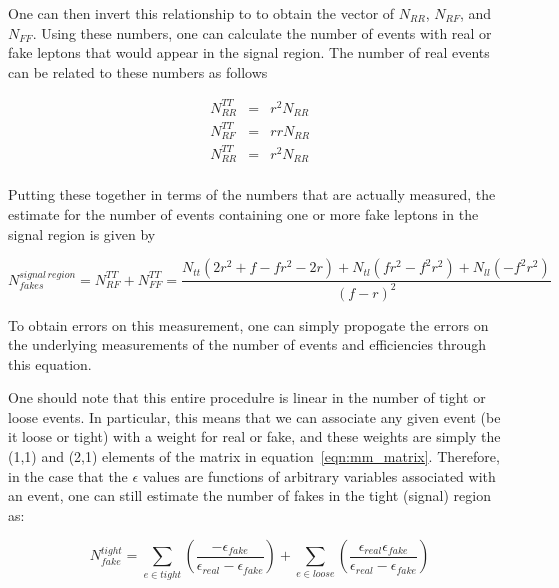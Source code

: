 One can then invert this relationship to to obtain the vector of $N_{RR}$, $N_{RF}$, and $N_{FF}$.
Using these numbers, one can calculate the number of events with real or fake leptons that would appear in the signal region.
The number of real events can be related to these numbers as follows

\begin{eqnarray*}
  N_{RR}^{TT} & = & r^2 N_{RR} \\
  N_{RF}^{TT} & = & r r N_{RR} \\
  N_{RR}^{TT} & = & r^2 N_{RR} \\
\end{eqnarray*}

Putting these together in terms of the numbers that are actually measured, the estimate for the number of events containing one or more fake leptons in the signal region is given by

\begin{equation}
N_{fakes}^{signal \, region} =  N_{RF}^{TT} + N_{FF}^{TT} = \frac{ N_{tt}(2r^2 + f - fr^2-2r) + N_{tl}(fr^2-f^2r^2) + N_{ll}(-f^2r^2) }{(f-r)^2} 
\end{equation}

To obtain errors on this measurement, one can simply propogate the errors on the underlying measurements of the number of events and efficiencies through this equation.

One should note that this entire procedulre is linear in the number of tight or loose events.
In particular, this means that we can associate any given event (be it loose or tight) with a weight for real or fake,
and these weights are simply the (1,1) and (2,1) elements of the matrix in equation~\ref{eqn:mm_matrix}.
Therefore, in the case that the $\epsilon$ values are functions of arbitrary variables associated with an event, one can still estimate the number of fakes in the tight (signal) region as:

\begin{equation}
  N^{tight}_{fake} = \sum_{e \in tight} (\frac{-\epsilon_{fake}}{\epsilon_{real} - \epsilon_{fake}}) + \sum_{e \in loose} (\frac{\epsilon_{real}\epsilon_{fake}}{\epsilon_{real} - \epsilon_{fake}})
  \label{eq:MatrixMethodSum}
\end{equation}


